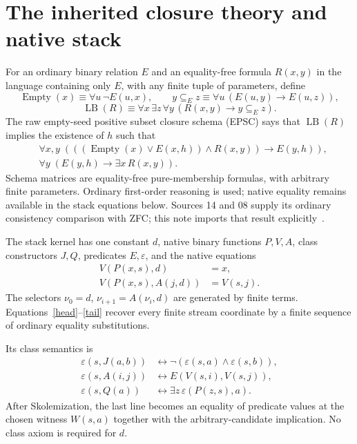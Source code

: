 \documentclass[11pt]{article}
\newcommand{\eps}{\varepsilon}
\newcommand{\LB}{\operatorname{LB}}
\newcommand{\Empty}{\operatorname{Empty}}
\begin{document}
\section{The inherited closure theory and native stack}

For an ordinary binary relation $E$ and an equality-free formula
$R(x,y)$ in the language containing only $E$, with any finite tuple of
parameters, define
\[
 \Empty(x)\equiv\forall u\,\neg E(u,x),\qquad
 y\subseteq_E z\equiv\forall u\,(E(u,y)\to E(u,z)),
\]
\[
 \LB(R)\equiv\forall x\,\exists z\,\forall y\,
               (R(x,y)\to y\subseteq_E z).
\]
The raw empty-seed positive subset closure schema (EPSC) says that
$\LB(R)$ implies the existence of $h$ such that
\begin{align}
 &\forall x,y\;(((\Empty(x)\lor E(x,h))\land R(x,y))\to E(y,h)),\label{epsc-close}\\
 &\forall y\;(E(y,h)\to\exists x\,R(x,y)).\label{epsc-support}
\end{align}
Schema matrices are equality-free pure-membership formulas, with arbitrary
finite parameters. Ordinary first-order reasoning is used; native equality
remains available in the stack equations below. Sources 14 and 08 supply
its ordinary consistency
comparison with ZFC; this note imports that result explicitly~\cite{epsc14}.

The stack kernel has one constant $d$, native binary functions $P,V,A$,
class constructors $J,Q$, predicates $E,\eps$, and the native equations
\begin{align}
 V(P(x,s),d)&=x,\label{head}\\
 V(P(x,s),A(j,d))&=V(s,j).\label{tail}
\end{align}
The selectors $\nu_0=d$, $\nu_{i+1}=A(\nu_i,d)$ are generated by finite
terms. Equations~\eqref{head}--\eqref{tail} recover every finite stream
coordinate by a finite sequence of ordinary equality substitutions.

Its class semantics is
\begin{align}
 \eps(s,J(a,b))&\leftrightarrow\neg(\eps(s,a)\land\eps(s,b)),\label{class-nand}\\
 \eps(s,A(i,j))&\leftrightarrow E(V(s,i),V(s,j)),\label{class-atom}\\
 \eps(s,Q(a))&\leftrightarrow\exists z\,\eps(P(z,s),a).\label{class-exists}
\end{align}
After Skolemization, the last line becomes an equality of predicate values
at the chosen witness $W(s,a)$ together with the arbitrary-candidate
implication. No class axiom is required for $d$.
\end{document}
